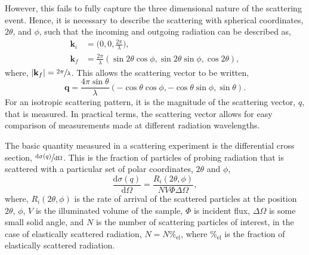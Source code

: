%
However, this fails to fully capture the three dimensional nature of the scattering event.
Hence, it is necessary to describe the scattering with spherical coordinates, $2\theta$, and $\phi$, such that the incoming and outgoing radiation can be described as,
%
\begin{equation}
    \begin{aligned}
        \mathbf{k}_i & = \bigg(0, 0, \frac{2\pi}{\lambda}\bigg), \\
        \mathbf{k}_f & = \frac{2\pi}{\lambda}(\sin{2\theta}\cos{\phi}, \sin{2\theta}\sin{\phi}, \cos{2\theta}),
    \end{aligned}
\end{equation}
%
where, $|\mathbf{k}_f| = \sfrac{2\pi}{\lambda}$. This allows the scattering vector to be written,
%
\begin{equation}
    \mathbf{q} = \frac{4\pi\sin{\theta}}{\lambda}(-\cos{\theta}\cos{\phi}, -\cos{\theta}\sin{\phi},\sin{\theta}).
\end{equation}
%
For an isotropic scattering pattern, it is the magnitude of the scattering vector, $q$, that is measured.
In practical terms, the scattering vector allows for easy comparison of measurements made at different radiation wavelengths.

The basic quantity measured in a scattering experiment is the differential cross section, $\sfrac{\text{d}\sigma(q)}{\text{d}\Omega}$.
This is the fraction of particles of probing radiation that is scattered with a particular set of polar coordinates, $2\theta$ and $\phi$,
%
\begin{equation}
    \frac{\text{d}\sigma(q)}{\text{d}\Omega} = \frac{R_i(2\theta,\phi)}{NV\Phi\Delta \Omega},
    \label{equ:dsc}
\end{equation}
%
where, $R_i(2\theta,\phi)$ is the rate of arrival of the scattered particles at the position $2\theta$, $\phi$, $V$ is the illuminated volume of the sample, $\Phi$ is incident flux, $\Delta \Omega$ is some small solid angle, and $N$ is the number of scattering particles of interest, in the case of elastically scattered radiation, $N = N\%_{\text{el}}$, where $\%_{\text{el}}$ is the fraction of elastically scattered radiation.

